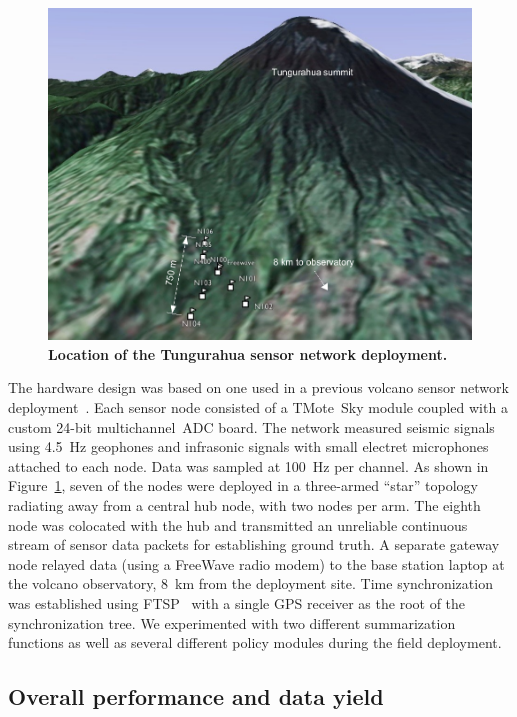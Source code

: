 \documentclass[lettersize]{sig-alternate-konrad}
\begin{document}
\begin{figure}[t]
\begin{center}
\includegraphics[width=1.0\hsize]{./figs/deploy/deployment-map.pdf}
\end{center}
\caption{\small {\bf Location of the Tungurahua sensor network
deployment.}}
\label{fig-deploy-map}
\end{figure}

The hardware design was based on one used in a previous volcano sensor
network deployment~\cite{volcano-osdi06}.
Each sensor node consisted of a TMote~Sky module
coupled with a custom 24-bit multichannel~ADC board. The network measured
seismic signals using 4.5~Hz geophones and infrasonic signals with small
electret microphones attached to each node.  Data was sampled at 100~Hz
per channel. As shown in Figure~\ref{fig-deploy-map}, seven of the nodes 
were deployed in a three-armed ``star'' topology radiating away from 
a central hub node, with two nodes per arm. 
The eighth node was colocated with the hub and 
transmitted an unreliable continuous stream of sensor data packets 
for establishing ground truth. 
A separate gateway node relayed data (using a FreeWave radio modem) 
to the base station laptop at the volcano observatory, 8~km
from the deployment site. Time synchronization was established using
FTSP~\cite{ftsp} with a single GPS receiver as the root of the
synchronization tree. 
We experimented with two different summarization functions as well as
several different policy modules during the field deployment.

\subsection{Overall performance and data yield}
\end{document}
